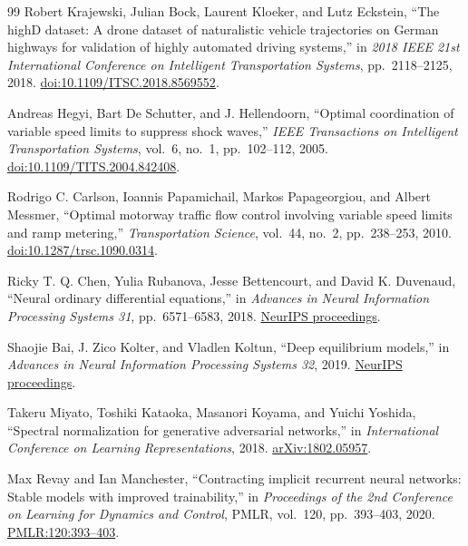 \documentclass[11pt,a4paper,openany]{book}
\numberwithin{equation}{chapter}
\numberwithin{figure}{chapter}
\numberwithin{table}{chapter}
\begin{document}
\begin{thebibliography}{99}
Robert Krajewski, Julian Bock, Laurent Kloeker, and Lutz Eckstein,
``The highD dataset: A drone dataset of naturalistic vehicle trajectories on German highways for validation of highly automated driving systems,''
in \emph{2018 IEEE 21st International Conference on Intelligent Transportation Systems}, pp.~2118--2125, 2018.
\href{https://doi.org/10.1109/ITSC.2018.8569552}{doi:10.1109/ITSC.2018.8569552}.

Andreas Hegyi, Bart De Schutter, and J. Hellendoorn,
``Optimal coordination of variable speed limits to suppress shock waves,''
\emph{IEEE Transactions on Intelligent Transportation Systems}, vol.~6, no.~1, pp.~102--112, 2005.
\href{https://doi.org/10.1109/TITS.2004.842408}{doi:10.1109/TITS.2004.842408}.

Rodrigo C. Carlson, Ioannis Papamichail, Markos Papageorgiou, and Albert Messmer,
``Optimal motorway traffic flow control involving variable speed limits and ramp metering,''
\emph{Transportation Science}, vol.~44, no.~2, pp.~238--253, 2010.
\href{https://doi.org/10.1287/trsc.1090.0314}{doi:10.1287/trsc.1090.0314}.

Ricky T. Q. Chen, Yulia Rubanova, Jesse Bettencourt, and David K. Duvenaud,
``Neural ordinary differential equations,''
in \emph{Advances in Neural Information Processing Systems 31}, pp.~6571--6583, 2018.
\href{https://proceedings.neurips.cc/paper/2018/hash/69386f6bb1dfed68692a24c8686939b9-Abstract.html}{NeurIPS proceedings}.

Shaojie Bai, J. Zico Kolter, and Vladlen Koltun,
``Deep equilibrium models,''
in \emph{Advances in Neural Information Processing Systems 32}, 2019.
\href{https://proceedings.neurips.cc/paper/2019/hash/01386bd6d8e091c2ab4c7c7de644d37b-Abstract.html}{NeurIPS proceedings}.

Takeru Miyato, Toshiki Kataoka, Masanori Koyama, and Yuichi Yoshida,
``Spectral normalization for generative adversarial networks,''
in \emph{International Conference on Learning Representations}, 2018.
\href{https://arxiv.org/abs/1802.05957}{arXiv:1802.05957}.

Max Revay and Ian Manchester,
``Contracting implicit recurrent neural networks: Stable models with improved trainability,''
in \emph{Proceedings of the 2nd Conference on Learning for Dynamics and Control},
PMLR, vol.~120, pp.~393--403, 2020.
\href{https://proceedings.mlr.press/v120/revay20a.html}{PMLR:120:393--403}.


\end{thebibliography}
\end{document}
